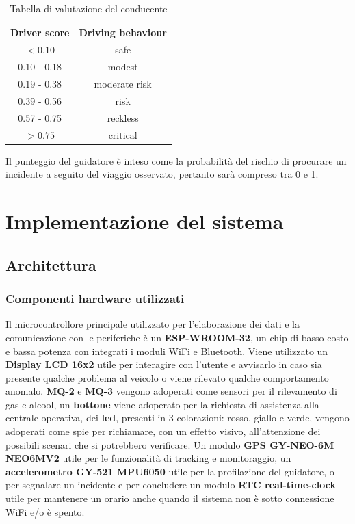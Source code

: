 \documentclass[12pt, a4paper, italian]{report}
\numberwithin{figure}{chapter}
\numberwithin{table}{chapter}
\begin{document}
\begin{table}[h!]
  \centering
  \begin{tabular}{|c|c|}
    \hline
    \textbf{Driver score} & \textbf{Driving behaviour} \\
    \hline
    \(< 0.10\) & safe \\
    \hline
    0.10 - 0.18 & modest \\
    \hline
    0.19 - 0.38 & moderate risk \\
    \hline
    0.39 - 0.56 & risk \\
    \hline
     0.57 - 0.75 & reckless \\
    \hline
     \(> 0.75\) & critical \\
    \hline
  \end{tabular}
  \caption{Tabella di valutazione del conducente}
  \label{tab:tabellaValutativa}
\end{table}

Il punteggio del guidatore è inteso come la probabilità del rischio di procurare un incidente a seguito del viaggio osservato, pertanto sarà compreso tra 0 e 1.

\chapter{Implementazione del sistema}
\section{Architettura}

\subsection{Componenti hardware utilizzati}

Il microcontrollore principale utilizzato per l'elaborazione dei dati e la comunicazione con le periferiche è un \textbf{ESP-WROOM-32}, un chip di basso costo e bassa potenza con integrati i moduli WiFi e Bluetooth. 
Viene utilizzato un \textbf{Display LCD 16x2} utile per interagire con l'utente e avvisarlo in caso sia presente qualche problema al veicolo o viene rilevato qualche comportamento anomalo. \textbf{MQ-2} e \textbf{MQ-3} vengono adoperati come sensori per il rilevamento di gas e alcool, un \textbf{bottone} viene adoperato per la richiesta di assistenza alla centrale operativa, dei \textbf{led}, presenti in 3 colorazioni: rosso, giallo e verde, vengono adoperati come spie per richiamare, con un effetto visivo, all'attenzione dei possibili scenari che si potrebbero verificare. 
Un modulo \textbf{GPS GY-NEO-6M NEO6MV2} utile per le funzionalità di tracking e monitoraggio, un \textbf{accelerometro GY-521 MPU6050} utile per la profilazione del guidatore, o per segnalare un incidente e per concludere un modulo \textbf{RTC real-time-clock} utile per mantenere un orario anche quando il sistema non è sotto connessione WiFi e/o è spento.
\end{document}
